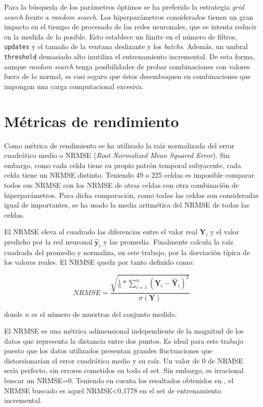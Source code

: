 Para la búsqueda de los parámetros óptimos se ha preferido la estrategia \textit{grid search} frente a \textit{random search}. Los hiperparámetros considerados tienen un gran impacto en el tiempo de procesado de las redes neuronales, que se intenta reducir en la medida de lo posible. Esto establece un límite en el número de filtros, \texttt{updates} y el tamaño de la ventana deslizante y los \textit{batchs}. Además, un umbral \texttt{threshold} demasiado alto inutiliza el entrenamiento incremental. De esta forma, aunque \textit{random search} tenga posibilidades de probar combinaciones con valores fuera de lo normal, es casi seguro que éstos desemboquen en combinaciones que impongan una carga computacional excesiva.


\section{Métricas de rendimiento}
Como métrica de rendimiento se ha utilizado la raíz normalizada del error cuadrático medio o NRMSE (\textit{Root Normalized Mean Squared Error}). Sin embargo, como cada celda tiene su propio patrón temporal subyacente, cada celda tiene un NRMSE distinto. Teniendo 49 o 225 celdas es imposible comparar todos sus NRMSE con los NRMSE de otras celdas con otra combinación de hiperparámetros. Para dicha comparación, como todas las celdas son consideradas igual de importantes, se ha usado la media aritmética del NRMSE de todas las celdas.

El NRMSE eleva al cuadrado las diferencias entre el valor real $\textbf{Y}_i$ y el valor predicho por la red neuronal $\hat{\textbf{y}}_i$ y las promedia. Finalmente calcula la raíz cuadrada del promedio y normaliza, en este trabajo, por la desviación típica de los valores reales. El NRMSE queda por tanto definido como:

\begin{equation*}
	NRMSE=\frac{\sqrt{\frac{1}{n}*\sum_{i=1}^{n}(\textbf{Y}_i-\hat{\textbf{Y}}_i)^2}}{\sigma(\textbf{Y})}
\end{equation*}

donde $n$ es el número de muestras del conjunto medido.

El NRMSE es una métrica adimensional independiente de la magnitud de los datos que representa la distancia entre dos puntos. Es ideal para este trabajo puesto que los datos utilizados presentan grandes fluctuaciones que distorsionarían el error cuadrático medio y su raíz. Un valor de 0 de NRMSE sería perfecto, sin errores cometidos en todo el set. Sin embargo, es irracional buscar un NRMSE=0. Teniendo en cuenta los resultados obtenidos en \cite{SKIMAcasaseca}, el NRMSE buscado es aquel NRMSE<0,1778 en el set de entrenamiento incremental.


